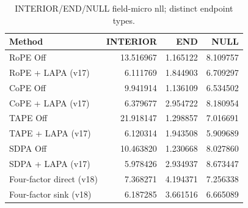 \begin{table}[t]
\centering
\scriptsize
\caption{INTERIOR/END/NULL field-micro nll; distinct endpoint types.}
\begin{tabular}{lrrr}
\toprule
Method & INTERIOR & END & NULL \\
\midrule
RoPE Off & 13.516967 & 1.165122 & 8.109757 \\
RoPE + LAPA (v17) & 6.111769 & 1.844903 & 6.709297 \\
CoPE Off & 9.941914 & 1.136109 & 6.534502 \\
CoPE + LAPA (v17) & 6.379677 & 2.954722 & 8.180954 \\
TAPE Off & 21.918147 & 1.298857 & 7.016691 \\
TAPE + LAPA (v17) & 6.120314 & 1.943508 & 5.909689 \\
SDPA Off & 10.463820 & 1.230668 & 8.027860 \\
SDPA + LAPA (v17) & 5.978426 & 2.934937 & 8.673447 \\
Four-factor direct (v18) & 7.368271 & 4.194371 & 7.256338 \\
Four-factor sink (v18) & 6.187285 & 3.661516 & 6.665089 \\
\bottomrule
\end{tabular}
\end{table}
